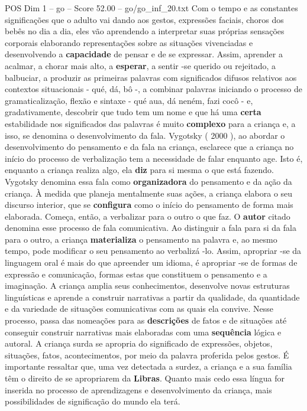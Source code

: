 \begin{textsample}{POS Dim 1 – go – Score 52.00 – go/go\_inf\_20.txt}
Com o tempo e as constantes significações que o adulto vai dando aos gestos, expressões faciais, choros dos bebês no dia a dia, eles vão aprendendo a interpretar suas próprias sensações corporais elaborando representações sobre as situações vivenciadas e desenvolvendo a \textbf{capacidade} de pensar e de se expressar.
Assim, aprender a acalmar, a chorar mais alto, a \textbf{esperar}, a sentir -se querido ou rejeitado, a balbuciar, a produzir as primeiras palavras com significados difusos relativos aos contextos situacionais - qué, dá, bô -, a combinar palavras iniciando o processo de gramaticalização, flexão e sintaxe - qué aua, dá neném, fazi cocô - e, gradativamente, descobrir que tudo tem um nome e que há uma \textbf{certa} estabilidade nos significados das palavras é muito \textbf{complexo} para a criança e, a isso, se denomina o desenvolvimento da fala.
Vygotsky ( 2000 ), ao abordar o desenvolvimento do pensamento e da fala na criança, esclarece que a criança no início do processo de verbalização tem a necessidade de falar enquanto age.
Isto é, enquanto a criança realiza algo, ela \textbf{diz} para si mesma o que está fazendo.
Vygotsky denomina essa fala como \textbf{organizadora} do pensamento e da ação da criança.
À medida que planeja mentalmente suas ações, a criança elabora o seu discurso interior, que se \textbf{configura} como o início do pensamento de forma mais elaborada.
Começa, então, a verbalizar para o outro o que faz.
O \textbf{autor} citado denomina esse processo de fala comunicativa.
Ao distinguir a fala para si da fala para o outro, a criança \textbf{materializa} o pensamento na palavra e, ao mesmo tempo, pode modificar o seu pensamento ao verbalizá -lo.
Assim, apropriar -se da linguagem oral é mais do que apreender um idioma, é apropriar -se de formas de expressão e comunicação, formas estas que constituem o pensamento e a imaginação.
A criança amplia seus conhecimentos, desenvolve novas estruturas linguísticas e aprende a construir narrativas a partir da qualidade, da quantidade e da variedade de situações comunicativas com as quais ela convive.
Nesse processo, passa das nomeações para as \textbf{descrições} de fatos e de situações até conseguir construir narrativas mais elaboradas com uma \textbf{sequência} lógica e autoral.
A criança surda se apropria do significado de expressões, objetos, situações, fatos, acontecimentos, por meio da palavra proferida pelos gestos.
É importante ressaltar que, uma vez detectada a surdez, a criança e a sua família têm o direito de se apropriarem da \textbf{Libras}.
Quanto mais cedo essa língua for inserida no processo de aprendizagens e desenvolvimento da criança, mais possibilidades de significação do mundo ela terá.

\end{textsample}
